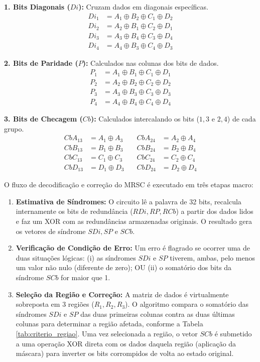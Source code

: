 \documentclass[12pt,a4paper]{article}
\begin{document}
\noindent\textbf{1. Bits Diagonais ($Di$):} Cruzam dados em diagonais específicas.
\begin{align*}
    Di_1 &= A_1 \oplus B_2 \oplus C_1 \oplus D_2 \\
    Di_2 &= A_2 \oplus B_1 \oplus C_2 \oplus D_1 \\
    Di_3 &= A_3 \oplus B_4 \oplus C_3 \oplus D_4 \\
    Di_4 &= A_4 \oplus B_3 \oplus C_4 \oplus D_3
\end{align*}

\noindent\textbf{2. Bits de Paridade ($P$):} Calculados nas colunas dos bits de dados.
\begin{align*}
    P_1 &= A_1 \oplus B_1 \oplus C_1 \oplus D_1 \\
    P_2 &= A_2 \oplus B_2 \oplus C_2 \oplus D_2 \\
    P_3 &= A_3 \oplus B_3 \oplus C_3 \oplus D_3 \\
    P_4 &= A_4 \oplus B_4 \oplus C_4 \oplus D_4
\end{align*}

\noindent\textbf{3. Bits de Checagem ($Cb$):} Calculados intercalando os bits ($1,3$ e $2,4$) de cada grupo.
\begin{align*}
    CbA_{13} &= A_1 \oplus A_3 \quad & CbA_{24} &= A_2 \oplus A_4 \\
    CbB_{13} &= B_1 \oplus B_3 \quad & CbB_{24} &= B_2 \oplus B_4 \\
    CbC_{13} &= C_1 \oplus C_3 \quad & CbC_{24} &= C_2 \oplus C_4 \\
    CbD_{13} &= D_1 \oplus D_3 \quad & CbD_{24} &= D_2 \oplus D_4
\end{align*}

O fluxo de decodificação e correção do MRSC é executado em três etapas macro:

\begin{enumerate}
    \item \textbf{Estimativa de Síndromes:} O circuito lê a palavra de 32 bits, recalcula internamente os bits de redundância ($RDi, RP, RCb$) a partir dos dados lidos e faz um XOR com as redundâncias armazenadas originais. O resultado gera os vetores de síndrome $SDi, SP$ e $SCb$.
    \item \textbf{Verificação de Condição de Erro:} Um erro é flagrado se ocorrer uma de duas situações lógicas: (i) as síndromes $SDi$ e $SP$ tiverem, ambas, pelo menos um valor não nulo (diferente de zero); OU (ii) o somatório dos bits da síndrome $SCb$ for maior que 1.
    \item \textbf{Seleção da Região e Correção:} A matriz de dados é virtualmente sobreposta em 3 regiões ($R_1, R_2, R_3$). O algoritmo compara o somatório das síndromes $SDi$ e $SP$ das duas primeiras colunas contra as duas últimas colunas para determinar a região afetada, conforme a Tabela \ref{tab:criterio_regiao}. Uma vez selecionada a região, o vetor $SCb$ é submetido a uma operação XOR direta com os dados daquela região (aplicação da máscara) para inverter os bits corrompidos de volta ao estado original.
\end{enumerate}
\end{document}
